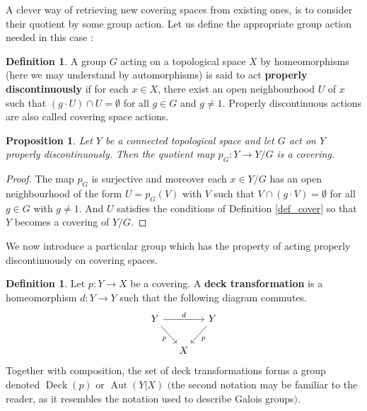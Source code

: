\documentclass{article}
\theoremstyle{plain}
\newtheorem{proposition}[theorem]{Proposition}
\theoremstyle{definition}
\newtheorem{definition}[theorem]{Definition}
\DeclareMathOperator{\Aut}{Aut}
\DeclareMathOperator{\Deck}{Deck}
\begin{document}
\noindent A clever way of retrieving new covering spaces from existing ones, is to consider their quotient by some group action. Let us define the appropriate group action needed in this case :

\begin{definition}
\label{properly_discontinuous}
    A group $G$ acting on a topological space $X$ by homeomorphisms (here we may understand by automorphisms) is said to act \textbf{properly discontinuously} if for each $x\in X$, there exist an open neighbourhood $U$ of $x$ such that $(g\cdot U)\cap U = \emptyset$ for all $g\in G$ and $g\neq 1$.
    Properly discontinuous actions are also called covering space actions.
\end{definition}


\begin{proposition}
\label{quotient_cover}
    Let $Y$ be a connected topological space and let $G$ act on $Y$ properly discontinuously. Then the quotient map $p_G : Y \rightarrow Y/G$ is a covering.
\end{proposition}
\begin{proof}
    The map $p_G$ is surjective and moreover each $x\in Y/G$ has an open neighbourhood of the form $U = p_G(V)$ with $V$ such that $V\cap (g\cdot V)=\emptyset$ for all $g\in G$ with $g\neq 1$. 
    And $U$ satisfies the conditions of Definition \ref{def_cover} so that $Y$ becomes a covering of $Y/G$.
\end{proof}


\noindent We now introduce a particular group which has the property of acting properly discontinuously on covering spaces.

\begin{definition}
    Let $p:Y\rightarrow X$ be a covering. A \textbf{deck transformation} is a homeomorphism $d:Y\rightarrow Y$ such that the following diagram commutes.
    \[
    \begin{tikzcd}[column sep=small]
                Y \arrow[rd,"p"'] \arrow[rr,"d"]   &   &Y \arrow[ld,"p"]\\
                                        & X                        
    \end{tikzcd}
    \]
    Together with composition, the set of deck transformations forms a group denoted $\Deck(p)$ or $\Aut(Y|X)$  $($the second notation may be familiar to the reader, as it resembles the notation used to describe Galois groups$)$.
\end{definition}
\end{document}

